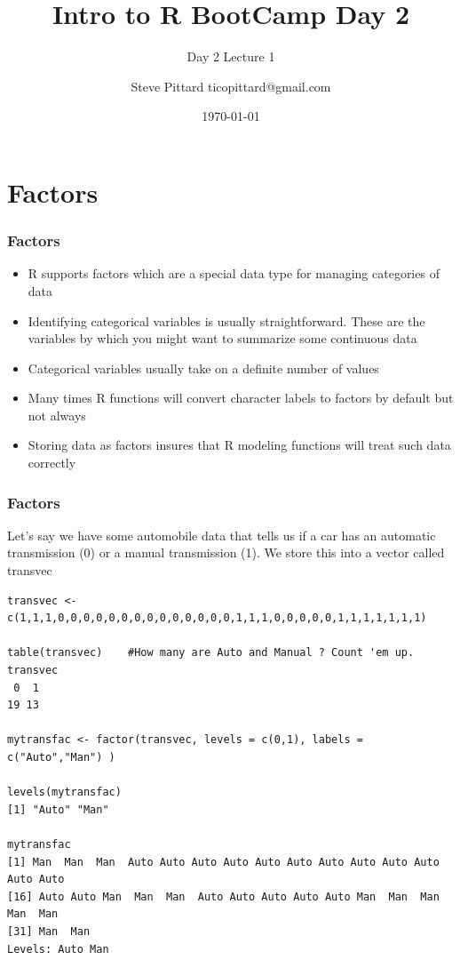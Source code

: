 \documentclass{beamer}
\begin{document}


\title{Intro to R BootCamp Day 2}
\author{Steve Pittard ticopittard@gmail.com}
\subtitle{Day 2 Lecture 1}
\date{\today}

\maketitle

\section{Factors}

\begin{frame}
\frametitle{Factors}
\begin{itemize}
\item R supports factors which are a special data type for managing categories of data
\item Identifying categorical variables is usually straightforward. These are the variables by which you might want to summarize some continuous data
\item Categorical variables usually take on a definite number of values
\item Many times R functions will convert character labels to factors by default but not always
\item Storing data as factors insures that R modeling functions will treat such data correctly
\end{itemize}
\end{frame}


\begin{frame}[fragile]
\frametitle{Factors}
Let's say we have some automobile data that tells us if a car has an automatic transmission (0) or a manual transmission (1). We store this into a vector called transvec 
\scriptsize
\begin{verbatim}
transvec <- c(1,1,1,0,0,0,0,0,0,0,0,0,0,0,0,0,0,1,1,1,0,0,0,0,0,1,1,1,1,1,1,1)

table(transvec)    #How many are Auto and Manual ? Count 'em up.
transvec
 0  1 
19 13

mytransfac <- factor(transvec, levels = c(0,1), labels = c("Auto","Man") )

levels(mytransfac)
[1] "Auto" "Man" 

mytransfac
[1] Man  Man  Man  Auto Auto Auto Auto Auto Auto Auto Auto Auto Auto Auto Auto
[16] Auto Auto Man  Man  Man  Auto Auto Auto Auto Auto Man  Man  Man  Man  Man 
[31] Man  Man 
Levels: Auto Man

\end{verbatim}

\end{frame}
\end{document}
